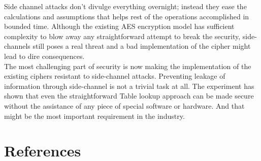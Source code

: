 \documentclass[3p]{elsarticle}
\begin{document}
Side channel attacks don't divulge everything overnight; instead they ease the calculations and assumptions that helps rest of the operations accomplished in bounded time. Although the existing AES encryption model has sufficient complexity to blow away any straightforward attempt to break the security, side-channels still poses a real threat and a bad implementation of the cipher might lead to dire consequences.\\

The most challenging part of security is now making the implementation of the existing ciphers resistant to side-channel attacks. Preventing leakage of information through side-channel is not a trivial task at all. The experiment has shown that even the straightforward Table lookup approach can be made secure without the assistance of any piece of special software or hardware. And that might be the most important requirement in the industry.

\clearpage


\section*{References}


\end{document}
